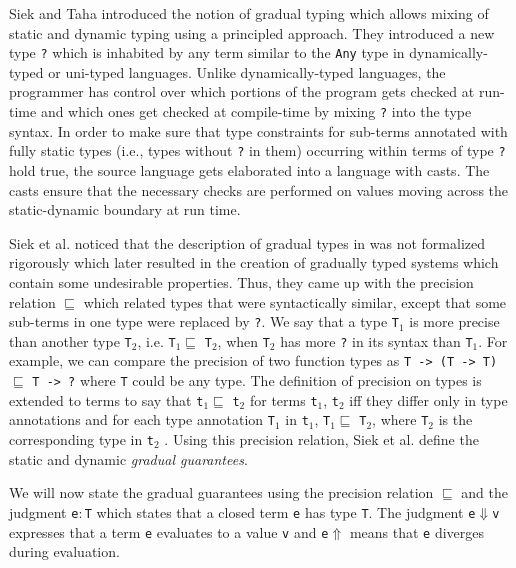 \documentclass{article}
\begin{document}
Siek and Taha\cite{siek_gradual_2006} introduced the notion of gradual typing
which allows mixing of static and dynamic typing using a principled approach.
They introduced a new type \verb|?| which is inhabited by any term similar to
the \verb|Any| type in dynamically-typed or uni-typed languages. Unlike
dynamically-typed languages, the programmer has control over which portions of
the program gets checked at run-time and which ones get checked at compile-time
by mixing \verb|?| into the type syntax. In order to make sure that type
constraints for sub-terms annotated with fully static types (i.e., types without
\verb|?| in them) occurring within terms of type \verb|?| hold true, the source
language gets elaborated into a language with casts. The casts ensure that the
necessary checks are performed on values moving across the static-dynamic
boundary at run time.

Siek et al.\cite{siek_refined_2015} noticed that the description of gradual
types in \cite{siek_gradual_2006} was not formalized rigorously which later
resulted in the creation of gradually typed systems which contain some
undesirable properties. Thus, they came up with the precision relation
\(\sqsubseteq\) which related types that were syntactically similar, except that
some sub-terms in one type were replaced by \verb|?|. We say that a type
\verb|T|\(_1\) is more precise than another type \verb|T|\(_2\), i.e.
\verb|T|\(_1 \sqsubseteq\) \verb|T|\(_2\), when \verb|T|\(_2\) has more \verb|?|
in its syntax than \verb|T|\(_1\). For example, we can compare the precision of
two function types as \verb|T -> (T -> T)| \(\sqsubseteq\) \verb|T -> ?| where
\verb|T| could be any type. The definition of precision on types is extended to
terms to say that \verb|t|\(_1 \sqsubseteq\) \verb|t|\(_2\) for terms
\verb|t|\(_1\), \verb|t|\(_2\) iff they differ only in type annotations and for
each type annotation \verb|T|\(_1\) in \verb|t|\(_1\), \verb|T|\(_1
\sqsubseteq\) \verb|T|\(_2\), where \verb|T|\(_2\) is the corresponding type in
\verb|t|\(_2\) . Using this precision relation, Siek et al. define the static
and dynamic \textit{gradual guarantees}.

We will now state the gradual guarantees using the precision relation
\(\sqsubseteq\) and the judgment \verb|e|\(:\)\verb|T| which states that a
closed term \verb|e| has type \verb|T|. The judgment
\verb|e|\(\Downarrow\)\verb|v| expresses that a term \verb|e| evaluates to a
value \verb|v| and \verb|e|\(\Uparrow\) means that \verb|e| diverges during
evaluation.
\end{document}
